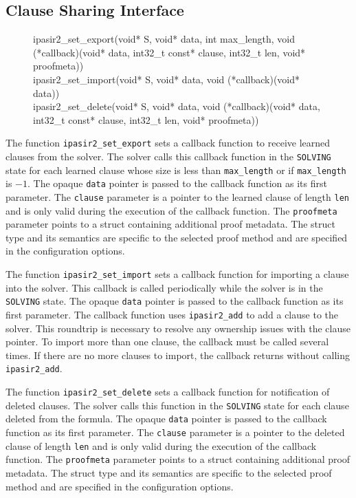 \documentclass[sat]{iosart2x}
\begin{document}
\subsection{Clause Sharing Interface}

\begin{figure}[h]
\tt\raggedright
ipasir2\_set\_export(void* S, void* data, int max\_length, void (*callback)(void* data, int32\_t const* clause, int32\_t len, void* proofmeta))\\
ipasir2\_set\_import(void* S, void* data, void (*callback)(void* data))\\
ipasir2\_set\_delete(void* S, void* data, void (*callback)(void* data, int32\_t const* clause, int32\_t len, void* proofmeta))
\end{figure}

The function \texttt{ipasir2\_set\_export} sets a callback function to receive learned clauses from the solver.
The solver calls this callback function in the \texttt{SOLVING} state for each learned clause whose size is less than \texttt{max\_length} or if \texttt{max\_length} is $-1$.
The opaque \texttt{data} pointer is passed to the callback function as its first parameter.
The \texttt{clause} parameter is a pointer to the learned clause of length \texttt{len} and is only valid during the execution of the callback function.
The \texttt{proofmeta} parameter points to a struct containing additional proof metadata.
The struct type and its semantics are specific to the selected proof method and are specified in the configuration options.

The function \texttt{ipasir2\_set\_import} sets a callback function for importing a clause into the solver.
This callback is called periodically while the solver is in the \texttt{SOLVING} state.
The opaque \texttt{data} pointer is passed to the callback function as its first parameter.
The callback function uses \texttt{ipasir2\_add} to add a clause to the solver.
This roundtrip is necessary to resolve any ownership issues with the clause pointer.
To import more than one clause, the callback must be called several times.
If there are no more clauses to import, the callback returns without calling \texttt{ipasir2\_add}.

The function \texttt{ipasir2\_set\_delete} sets a callback function for notification of deleted clauses.
The solver calls this function in the \texttt{SOLVING} state for each clause deleted from the formula.
The opaque \texttt{data} pointer is passed to the callback function as its first parameter.
The \texttt{clause} parameter is a pointer to the deleted clause of length \texttt{len} and is only valid during the execution of the callback function.
The \texttt{proofmeta} parameter points to a struct containing additional proof metadata.
The struct type and its semantics are specific to the selected proof method and are specified in the configuration options.
\end{document}
